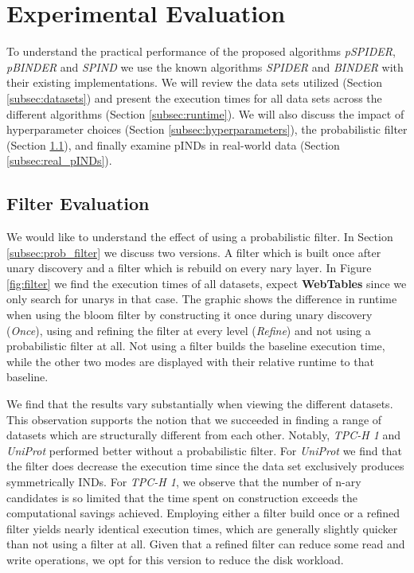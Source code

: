 \section{Experimental Evaluation}\label{sec:eval}
To understand the practical performance of the proposed algorithms \textit{pSPIDER}, \textit{pBINDER} and \textit{SPIND} we use the known algorithms \textit{SPIDER} and \textit{BINDER} with their existing implementations. We will review the data sets utilized (Section \ref{subsec:datasets}) and present the execution times for all data sets across the different algorithms (Section \ref{subsec:runtime}). We will also discuss the impact of hyperparameter choices (Section \ref{subsec:hyperparameters}), the probabilistic filter (Section \ref{subsec:filter_res}), and finally examine pINDs in real-world data (Section \ref{subsec:real_pINDs}).



\subsection{Filter Evaluation} \label{subsec:filter_res}
We would like to understand the effect of using a probabilistic filter. In Section \ref{subsec:prob_filter} we discuss two versions. A filter which is built once after unary discovery and a filter which is rebuild on every nary layer. In Figure \ref{fig:filter} we find the execution times of all datasets, expect \textbf{WebTables} since we only search for unarys in that case. The graphic shows the difference in runtime when using the bloom filter by constructing it once during unary discovery (\textit{Once}), using and refining the filter at every level (\textit{Refine}) and not using a probabilistic filter at all. Not using a filter builds the baseline execution time, while the other two modes are displayed with their relative runtime to that baseline.

We find that the results vary substantially when viewing the different datasets. This observation supports the notion that we succeeded in finding a range of datasets which are structurally different from each other. Notably, \textit{TPC-H 1} and \textit{UniProt} performed better without a probabilistic filter. For \textit{UniProt} we find that the filter does decrease the execution time since the data set exclusively produces symmetrically INDs. For \textit{TPC-H 1}, we observe that the number of n-ary candidates is so limited that the time spent on construction exceeds the computational savings achieved. Employing either a filter build once or a refined filter yields nearly identical execution times, which are generally slightly quicker than not using a filter at all. Given that a refined filter can reduce some read and write operations, we opt for this version to reduce the disk workload.

